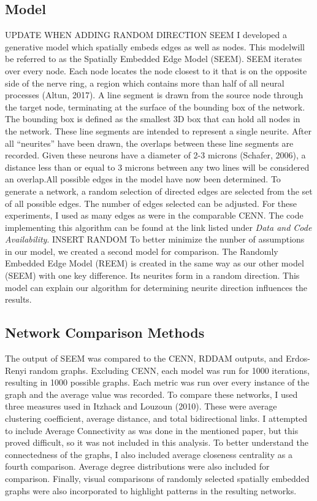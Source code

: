 \subsection{Model}
UPDATE WHEN ADDING RANDOM DIRECTION SEEM I developed a generative model which spatially embeds edges as well as nodes. This modelwill be referred to as the Spatially Embedded Edge Model (SEEM). SEEM iterates over every node. Each node locates the node closest to it that is on the opposite side of the nerve ring, a region which contains more than half of all neural processes (Altun, 2017). A line segment is drawn from the source node through the target node, terminating at the surface of the bounding box of the network. The bounding box is defined as the smallest 3D box that can hold all nodes in the network. These line segments are intended to represent a single neurite. After all “neurites” have been drawn, the overlaps between these line segments are recorded. Given these neurons have a diameter of 2-3 microns (Schafer, 2006), a distance less than or equal to 3 microns between any two lines will be considered an overlap.All possible edges in the model have now been determined. To generate a network, a random selection of directed edges are selected from the set of all possible edges. The number of edges selected can be adjusted. For these experiments, I used as many edges as were in the comparable CENN. The code implementing this algorithm can be found at the link listed under \textit{Data and Code Availability}. INSERT RANDOM
To better minimize the nunber of assumptions in our model, we created a second model for comparison. The Randomly Embedded Edge Model (REEM) is created in the same way as our other model (SEEM) with one key difference. Its neurites form in a random direction. This model can explain our algorithm for determining neurite direction influences the results.
\subsection{Network Comparison Methods}
The output of SEEM was compared to the CENN, RDDAM outputs, and Erdos-Renyi random graphs. Excluding CENN, each model was run for 1000 iterations, resulting in 1000 possible graphs. Each metric was run over every instance of the graph and the average value was recorded. 
To compare these networks, I used three measures used in Itzhack and Louzoun (2010). These were average clustering coefficient, average distance, and total bidirectional links. I attempted to include Average Connectivity as was done in the mentioned paper, but this proved difficult, so it was not included in this analysis. To better understand the connectedness of the graphs, I also included average closeness centrality as a fourth comparison. Average degree distributions were also included for comparison. Finally, visual comparisons of randomly selected spatially embedded graphs were also incorporated to highlight patterns in the resulting networks.
